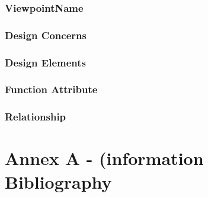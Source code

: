 \documentclass[letterpaper, 10pt, draftclsnofoot, compsoc, onecolumn]{IEEEtran}
\begin{document}
\subsubsection{ViewpointName}
{\noindent  \par}

\subsubsection{Design Concerns}
{\noindent  \par}

\subsubsection{Design Elements}
{\noindent  \par}

\subsubsection{Function Attribute}
{\noindent  \par}

\subsubsection{Relationship}







\newpage

\section{Annex A - (information Bibliography}

\nocite{*}







\newpage
\end{document}
